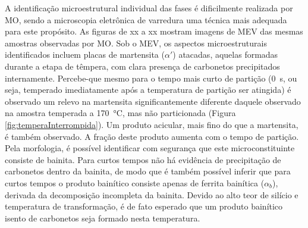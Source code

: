 A identificação microestrutural individual das fases é dificilmente realizada por MO, sendo a microscopia eletrônica de varredura uma técnica mais adequada para este propósito. 
As figuras de xx a xx mostram imagens de MEV das mesmas amostras observadas por MO.
Sob o MEV, os aspectos microestruturais identificados incluem placas de martensita ($\alpha'$) atacadas, aquelas formadas durante a etapa de têmpera, com clara presença de carbonetos precipitados internamente. Percebe-que mesmo para o tempo mais curto de partição (0~s, ou seja, temperado imediatamente após a temperatura de partição ser atingida) é observado um relevo na martensita significantemente diferente daquele observado na amostra temperada a \SI{170}{\degreeCelsius}, mas não particionada (Figura \ref{fig:temperaInterrompida}). Um produto acicular, mais fino do que a martensita, é também observado. A fração deste produto aumenta com o tempo de partição. Pela morfologia, é possível identificar com segurança que este microconstituinte consiste de bainita. Para curtos tempos não há evidência de precipitação de carbonetos dentro da bainita, de modo que é também possível inferir que para curtos tempos o produto bainítico consiste apenas de ferrita bainítica ($\alpha_b$), derivada da decomposição incompleta da bainita. Devido ao alto teor de silício e temperatura de transformação, é de fato esperado que um produto bainítico isento de carbonetos seja formado nesta temperatura. 

\begin{figure}
  \centering
  \quad
  \caption{}
  \label{fig:TP375-0_MEV}
\end{figure}

